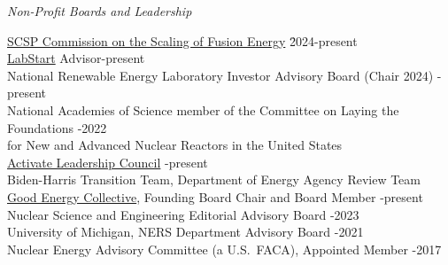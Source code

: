 \textit{Non-Profit Boards and Leadership}
\vspace*{-.4em}
\begin{tabbing}
\hspace*{1 em}\= \href{https://www.scsp.ai/fusion/}{SCSP Commission on the Scaling of Fusion Energy} \hspace*{15em} \= 2024-present\\
%
\> \href{https://www.labstart.xyz/}{LabStart} Advisor-present\\
%
\> National Renewable Energy Laboratory Investor Advisory Board (Chair 2024) -present\\
%
\> National Academies of Science member of the Committee on Laying the
Foundations \hspace*{0.5em} -2022\\
\> \hspace*{1em} for New and Advanced Nuclear Reactors in the United States\\
%
\> \href{https://www.activate.org/leadership-council}{Activate Leadership Council} -present\\
\> Biden-Harris Transition Team, Department of Energy Agency Review Team \\
%
\> \href{https://www.goodenergycollective.org/}{Good Energy Collective}, Founding Board Chair and Board Member -present\\
%
%
\> Nuclear Science and Engineering Editorial Advisory Board -2023\\
%
\> University of Michigan, NERS Department Advisory Board -2021\\
%
%
%
\> Nuclear Energy Advisory Committee (a U.S.\ FACA), Appointed Member -2017 
%
%
%
\end{tabbing}

